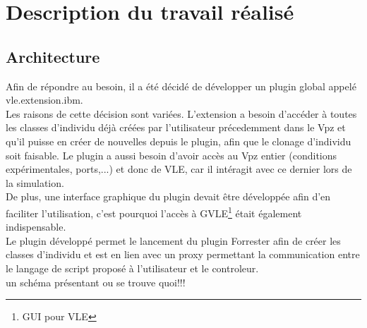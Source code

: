 \chapter{Description du travail réalisé}
\setlength{\parskip}{2.5ex plus .4ex minus .4ex}

\section{Architecture}
Afin de répondre au besoin, il a été décidé de développer un plugin global appelé vle.extension.ibm.\\
Les raisons de cette décision sont variées. L'extension a besoin d'accéder à toutes les classes d'individu déjà créées par l'utilisateur précedemment dans le Vpz et qu'il puisse en créer de nouvelles depuis le plugin, afin que le clonage d'individu soit faisable. Le plugin a aussi besoin d'avoir accès au Vpz entier (conditions expérimentales, ports,...) et donc de VLE, car il intéragit avec ce dernier lors de la simulation.\\
De plus, une interface graphique du plugin devait être développée afin d'en faciliter l'utilisation, c'est pourquoi l'accès à GVLE\footnote{GUI pour VLE} était également indispensable.\\

Le plugin développé permet le lancement du plugin Forrester afin de créer les classes d'individu et est en lien avec un proxy permettant la communication entre le langage de script proposé à l'utilisateur et le controleur.\\

un schéma présentant ou se trouve quoi!!!

